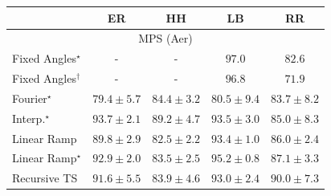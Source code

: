 \begin{tabular}{l|cccc|}
\toprule
            & ER & HH & LB & RR \\
\midrule
\multicolumn{5}{c}{\rule{0pt}{8pt}MPS (Aer)} \\
\midrule
Fixed Angles$^\star$ & {\cellcolor[HTML]{000000}} \color[HTML]{F1F1F1} {\cellcolor{white}} \color{black} - & {\cellcolor[HTML]{000000}} \color[HTML]{F1F1F1} {\cellcolor{white}} \color{black} - & {\cellcolor[HTML]{50014E}} \color[HTML]{F1F1F1} $97.0$ & {\cellcolor[HTML]{8B5CAA}} \color[HTML]{F1F1F1} $82.6$ \\
Fixed Angles$^\dagger$ & {\cellcolor[HTML]{000000}} \color[HTML]{F1F1F1} {\cellcolor{white}} \color{black} - & {\cellcolor[HTML]{000000}} \color[HTML]{F1F1F1} {\cellcolor{white}} \color{black} - & {\cellcolor[HTML]{520150}} \color[HTML]{F1F1F1} $96.8$ & {\cellcolor[HTML]{95AAD0}} \color[HTML]{F1F1F1} $71.9$ \\
Fourier$^\star$ & {\cellcolor[HTML]{8C74B5}} \color[HTML]{F1F1F1} $79.4\pm 5.7$ & {\cellcolor[HTML]{894DA3}} \color[HTML]{F1F1F1} $84.4\pm 3.2$ & {\cellcolor[HTML]{8C6AB1}} \color[HTML]{F1F1F1} $80.5\pm 9.4$ & {\cellcolor[HTML]{8A52A5}} \color[HTML]{F1F1F1} $83.7\pm 8.2$ \\
Interp.$^\star$ & {\cellcolor[HTML]{6F0A6B}} \color[HTML]{F1F1F1} $93.7\pm 2.1$ & {\cellcolor[HTML]{84258B}} \color[HTML]{F1F1F1} $89.2\pm 4.7$ & {\cellcolor[HTML]{710A6D}} \color[HTML]{F1F1F1} $93.5\pm 3.0$ & {\cellcolor[HTML]{8949A1}} \color[HTML]{F1F1F1} $85.0\pm 8.3$ \\
Linear Ramp & {\cellcolor[HTML]{832088}} \color[HTML]{F1F1F1} $89.8\pm 2.9$ & {\cellcolor[HTML]{8B5CAA}} \color[HTML]{F1F1F1} $82.5\pm 2.2$ & {\cellcolor[HTML]{710A6D}} \color[HTML]{F1F1F1} $93.4\pm 1.0$ & {\cellcolor[HTML]{88419D}} \color[HTML]{F1F1F1} $86.0\pm 2.4$ \\
Linear Ramp$^\star$ & {\cellcolor[HTML]{760C71}} \color[HTML]{F1F1F1} $92.9\pm 2.0$ & {\cellcolor[HTML]{8A54A6}} \color[HTML]{F1F1F1} $83.5\pm 2.5$ & {\cellcolor[HTML]{61065D}} \color[HTML]{F1F1F1} $95.2\pm 0.8$ & {\cellcolor[HTML]{873897}} \color[HTML]{F1F1F1} $87.1\pm 3.3$ \\
Recursive TS & {\cellcolor[HTML]{810F7C}} \color[HTML]{F1F1F1} $91.6\pm 5.5$ & {\cellcolor[HTML]{8A51A5}} \color[HTML]{F1F1F1} $83.9\pm 4.6$ & {\cellcolor[HTML]{740B70}} \color[HTML]{F1F1F1} $93.0\pm 2.4$ & {\cellcolor[HTML]{831F86}} \color[HTML]{F1F1F1} $90.0\pm 7.3$ \\

\end{tabular}
